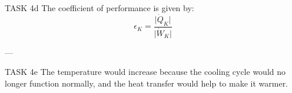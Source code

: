 TASK 4d  
The coefficient of performance is given by:  
\[
\epsilon_K = \frac{\lvert \dot{Q}_K \rvert}{\lvert \dot{W}_K \rvert}
\]

---

TASK 4e  
The temperature would increase because the cooling cycle would no longer function normally, and the heat transfer would help to make it warmer.